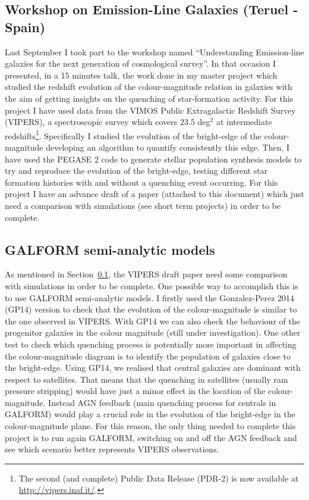 \documentclass[letterpaper]{article}
\begin{document}


\subsection{Workshop on Emission-Line Galaxies (Teruel - Spain) }
\label{sub:teruel}

Last September I took part to the workshop named ``Understanding Emission-line galaxies for the next generation of cosmological survey''. In that occasion I presented, in a 15 minutes talk, the work done in my master project which studied the redshift evolution of the colour-magnitude relation in galaxies with the aim of getting insights on the quenching of star-formation activity. For this project I have used data from the VIMOS Public Extragalactic Redshift Survey (VIPERS), a spectroscopic survey which covers $23.5$ deg$^2$ at intermediate redshifts\footnote{The second (and complete) Public Data Release (PDR-2) is now available at \url{http://vipers.inaf.it/}. }. Specifically I studied the evolution of the bright-edge of the colour-magnitude developing an algorithm to quantify consistently this edge. Then, I have used the PEGASE 2 code to generate stellar population synthesis models to try and reproduce the evolution of the bright-edge, testing different star formation histories with and without a quenching event occurring. For this project I have an advance draft of a paper (attached to this document) which just need a comparison with simulations (see short term projects) in order to be complete.

\subsection{GALFORM semi-analytic models}
As mentioned in Section~\ref{sub:teruel}, the VIPERS draft paper need some comparison with simulations in order to be complete. One possible way to accomplish this is to use GALFORM semi-analytic models. I firstly used the Gonzalez-Perez 2014 (GP14) version to check that the evolution of the colour-magnitude is similar to the one observed in VIPERS. With GP14 we can also check the behaviour of the progenitor galaxies in the colour magnitude (still under investigation). One other test to check which quenching process is potentially more important in affecting the colour-magnitude diagram is to identify the population of galaxies close to the bright-edge. Using GP14, we realised that central galaxies are dominant with respect to satellites. That means that the quenching in satellites (usually ram pressure stripping) would have just a minor effect in the location of the colour-magnitude. Instead AGN feedback (main quenching process for centrals in GALFORM) would play a crucial role in the evolution of the bright-edge in the colour-magnitude plane. For this reason, the only thing needed to complete this project is to run again GALFORM, switching on and off the AGN feedback and see which scenario better represents VIPERS observations. 
\end{document}
